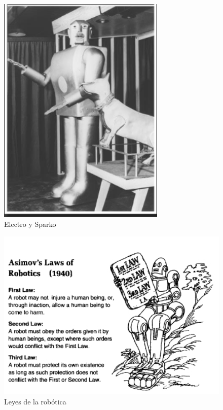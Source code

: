 \begin{figure} [h!]
	\begin{center}
		\includegraphics[width=8cm]{figs/electro-sparko.png}
	\end{center}
	\caption{Electro y Sparko} %
	\label{fig:EyS}
\end{figure}

\begin{figure} [h!]
	\begin{center}
		\includegraphics[width=12cm]{figs/issac-law.png}
	\end{center}
	\caption{ Leyes de la robótica} %
\label{fig:Asimov}
\end{figure}


